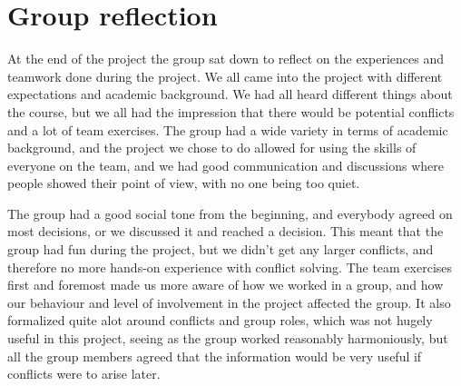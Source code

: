 \chapter{Group reflection}
\label{chap:reflection}
%
At the end of the project the group sat down to reflect on the experiences and teamwork done during the project. We all came into the project with different expectations and academic background. We had all heard different things about the course, but we all had the impression that there would be potential conflicts and a lot of team exercises. The group had a wide variety in terms of academic background, and the project we chose to do allowed for using the skills of everyone on the team, and we had good communication and discussions where people showed their point of view, with no one being too quiet. 

The group had a good social tone from the beginning, and everybody agreed on most decisions, or we discussed it and reached a decision. This meant that the group had fun during the project, but we didn't get any larger conflicts, and therefore no more hands-on experience with conflict solving. The team exercises first and foremost made us more aware of how we worked in a group, and how our behaviour and level of involvement in the project affected the group. It also formalized quite alot around conflicts and group roles, which was not hugely useful in this project, seeing as the group worked reasonably harmoniously, but all the group members agreed that the information would be very useful if conflicts were to arise later. 